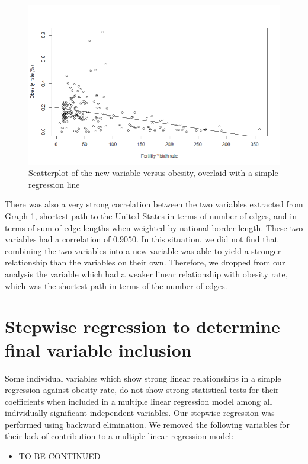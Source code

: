 \documentclass[oneside,12pt]{report}
\begin{document}
\begin{figure}
\centering
\label{fig:fertility.birth_rate}
\includegraphics[width=\textwidth]{fertility-birth_rate-obesity-scatter.png}
\caption[Scatterplot of a new variable created from combining two variables]{Scatterplot of the new variable versus obesity, overlaid with a simple regression line}
\end{figure}

There was also a very strong correlation between the two variables extracted from Graph 1, shortest path to the United States in terms of number of edges, and in terms of sum of edge lengths when weighted by national border length. These two variables had a correlation of \begin{math}0.9050\end{math}. In this situation, we did not find that combining the two variables into a new variable was able to yield a stronger relationship than the variables on their own. Therefore, we dropped from our analysis the variable which had a weaker linear relationship with obesity rate, which was the shortest path in terms of the number of edges.

\section*{Stepwise regression to determine final variable inclusion}

Some individual variables which show strong linear relationships in a simple regression against obesity rate, do not show strong statistical tests for their coefficients when included in a multiple linear regression model among all individually significant independent variables. Our stepwise regression was performed using backward elimination. We removed the following variables for their lack of contribution to a multiple linear regression model:
\begin{itemize}
\item TO BE CONTINUED
\end{itemize}
\end{document}
